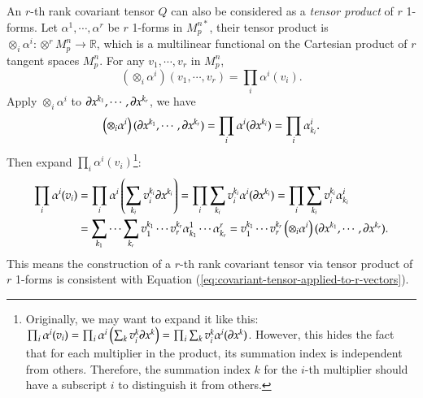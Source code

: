 \documentclass[11pt, a4paper]{book}
\begin{document}
An $r$-th rank covariant tensor $Q$ can also be considered as a \emph{tensor product} of
$r$ 1-forms. Let $\alpha^1,\cdots,\alpha^r$ be $r$ 1-forms in $M_p^{n*}$, their tensor product
is $\otimes_i\alpha^i: \otimes^r M_p^n \rightarrow \mathbb{R}$, which is a multilinear
functional on the Cartesian product of $r$ tangent spaces $M_p^n$. For any
$v_1, \cdots, v_r$ in $M_p^n$,
\begin{equation}
  \left(\otimes_i\alpha^i\right)(v_1,\cdots,v_r) = \prod_i \alpha^i(v_i).
\end{equation}
Apply $\otimes_i\alpha^i$ to $\boldsymbol{\partial}x^{k_1},\cdots,\boldsymbol{\partial}x^{k_r}$, we have
\begin{equation}
  \left( \otimes_i\alpha^i \right)(\boldsymbol{\partial}x^{k_1},\cdots,\boldsymbol{\partial}x^{k_r}) =
  \prod_i\alpha^i(\boldsymbol{\partial}x^{k_i}) = \prod_i \alpha_{k_i}^{i}.
\end{equation}
Then expand $\prod_i \alpha^i(v_i)$\footnote{Originally, we may want to expand it like this:
  $\prod_i \alpha^i(v_i) = \prod_i \alpha^i\left( \sum_k v_i^k \boldsymbol{\partial}x^k \right) =
  \prod_i \sum_k v_i^k \alpha^i(\boldsymbol{\partial}x^k)$. However, this hides the fact that for
  each multiplier in the product, its summation index is independent from others.
  Therefore, the summation index $k$ for the $i$-th multiplier should have a subscript $i$
  to distinguish it from others.}:
\begin{equation}
  \begin{aligned}
    \prod_i \alpha^i(v_i) &= \prod_i \alpha^i\left( \sum_{k_i}v_i^{k_i}
      \boldsymbol{\partial}x^{k_i} \right) = \prod_i \sum_{k_i}v_i^{k_i}
    \alpha^i(\boldsymbol{\partial}x^{k_i}) = \prod_i \sum_{k_i} v_i^{k_i} \alpha_{k_i}^i \\
    &= \sum_{k_1}\cdots\sum_{k_r} v_1^{k_1}\cdots v_r^{k_r}
    \alpha_{k_1}^1\cdots\alpha_{k_r}^r = v_1^{k_1}\cdots v_r^{k_r} \left(
      \otimes_i\alpha^i \right)(\boldsymbol{\partial}x^{k_1},\cdots,\boldsymbol{\partial}x^{k_r}).
  \end{aligned}
\end{equation}
This means the construction of a $r$-th rank covariant tensor via tensor product of $r$
1-forms is consistent with Equation (\ref{eq:covariant-tensor-applied-to-r-vectors}).
\end{document}
